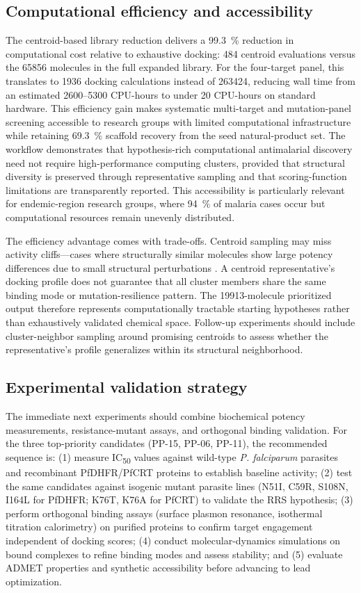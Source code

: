 \documentclass[journal=jcisd8,manuscript=article]{achemso}
\begin{document}
\subsection{Computational efficiency and accessibility}
The centroid-based library reduction delivers a \qty{99.3}{\percent} reduction in computational cost relative to exhaustive docking: \num{484} centroid evaluations versus the \num{65856} molecules in the full expanded library. For the four-target panel, this translates to \num{1936} docking calculations instead of \num{263424}, reducing wall time from an estimated \numrange{2600}{5300} CPU-hours to under \num{20} CPU-hours on standard hardware. This efficiency gain makes systematic multi-target and mutation-panel screening accessible to research groups with limited computational infrastructure while retaining \qty{69.3}{\percent} scaffold recovery from the seed natural-product set. The workflow demonstrates that hypothesis-rich computational antimalarial discovery need not require high-performance computing clusters, provided that structural diversity is preserved through representative sampling and that scoring-function limitations are transparently reported. This accessibility is particularly relevant for endemic-region research groups, where \qty{94}{\percent} of malaria cases occur \cite{WHO2024MalariaReport} but computational resources remain unevenly distributed.

The efficiency advantage comes with trade-offs. Centroid sampling may miss activity cliffs—cases where structurally similar molecules show large potency differences due to small structural perturbations \cite{Stumpfe2012}. A centroid representative's docking profile does not guarantee that all cluster members share the same binding mode or mutation-resilience pattern. The \num{19913}-molecule prioritized output therefore represents computationally tractable starting hypotheses rather than exhaustively validated chemical space. Follow-up experiments should include cluster-neighbor sampling around promising centroids to assess whether the representative's profile generalizes within its structural neighborhood.

\subsection{Experimental validation strategy}
The immediate next experiments should combine biochemical potency measurements, resistance-mutant assays, and orthogonal binding validation. For the three top-priority candidates (PP-15, PP-06, PP-11), the recommended sequence is: (1) measure IC\textsubscript{50} values against wild-type \emph{P. falciparum} parasites and recombinant PfDHFR/PfCRT proteins to establish baseline activity; (2) test the same candidates against isogenic mutant parasite lines (N51I, C59R, S108N, I164L for PfDHFR; K76T, K76A for PfCRT) to validate the RRS hypothesis; (3) perform orthogonal binding assays (surface plasmon resonance, isothermal titration calorimetry) on purified proteins to confirm target engagement independent of docking scores; (4) conduct molecular-dynamics simulations on bound complexes to refine binding modes and assess stability; and (5) evaluate ADMET properties and synthetic accessibility before advancing to lead optimization.
\end{document}
